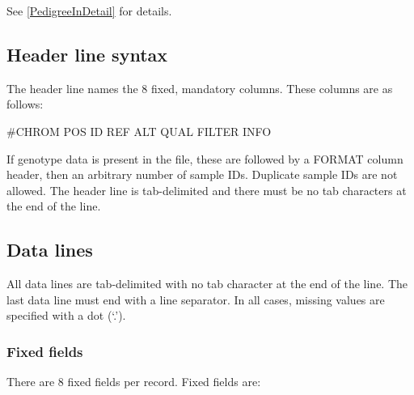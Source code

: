 \documentclass[8pt]{article}
\begin{document}
\noindent See \ref{PedigreeInDetail} for details.


\subsection{Header line syntax}
\label{header-line}
The header line names the 8 fixed, mandatory columns. These columns are as follows:
\begin{center}
       \#CHROM
\qquad POS
\qquad ID
\qquad REF
\qquad ALT
\qquad QUAL
\qquad FILTER
\qquad INFO
\end{center}
\noindent
If genotype data is present in the file, these are followed by a FORMAT column header, then an arbitrary number of sample IDs.
Duplicate sample IDs are not allowed.
The header line is tab-delimited and there must be no tab characters at the end of the line.

\subsection{Data lines}
\label{data-lines}
All data lines are tab-delimited with no tab character at the end of the line.
The last data line must end with a line separator.
In all cases, missing values are specified with a dot (`.').

\subsubsection{Fixed fields}
\label{fixed-fields}
There are 8 fixed fields per record.
Fixed fields are:
\end{document}
